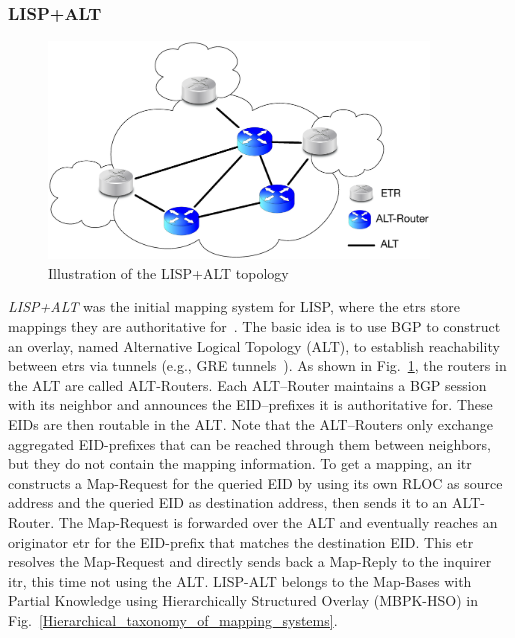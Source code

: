 \subsubsection{LISP+ALT}
\label{sec:lispalt}
\begin{figure}[!t]
	\centering
	\includegraphics[width=0.9\textwidth]{Chapter2/Pics/LISP_ALT.eps}
	\caption{Illustration of the LISP+ALT topology}
	\label{LISP_ALT}
\end{figure}
\emph{LISP+ALT} was the initial mapping system for LISP, where the \acrshort{etr}s store mappings they are authoritative for~\cite{lispCCR}. The basic idea is to use BGP to construct an overlay, named Alternative Logical Topology (ALT), to establish reachability between \acrshort{etr}s via tunnels (e.g., GRE tunnels~\cite{farinacci2000rfc}). As shown in Fig.~\ref{LISP_ALT}, the routers in the ALT are called ALT-Routers. Each ALT–Router maintains a BGP session with its neighbor and announces the EID–prefixes it is authoritative for. These EIDs are then routable in the ALT. Note that the ALT–Routers only exchange aggregated EID-prefixes that can be reached through them between neighbors, but they do not contain the mapping information. To get a mapping, an \acrshort{itr} constructs a Map-Request for the queried EID by using its own RLOC as source address and the queried EID as destination address, then sends it to an ALT-Router. The Map-Request is forwarded over the ALT and eventually reaches an originator \acrshort{etr} for the EID-prefix that matches the destination EID. This \acrshort{etr} resolves the Map-Request and directly sends back a Map-Reply to the inquirer \acrshort{itr}, this time not using the ALT. LISP-ALT belongs to the Map-Bases with Partial Knowledge using Hierarchically Structured Overlay (MBPK-HSO) in Fig.~\ref{Hierarchical_taxonomy_of_mapping_systems}.


